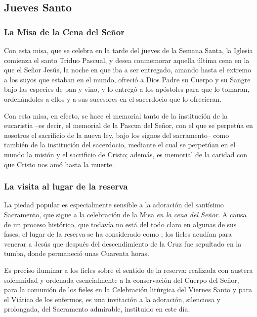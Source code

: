 \begin{introstyle}
\subsection{Jueves Santo} 

\subsubsection{La Misa de la Cena del Señor}

Con esta misa, que se celebra en la tarde del jueves de la Semana Santa, la Iglesia comienza el santo Triduo Pascual, y desea conmemorar aquella última cena en la que el Señor Jesús, la noche en que iba a ser entregado, amando hasta el extremo a los suyos que estaban en el mundo, ofreció a Dios Padre su Cuerpo y su Sangre bajo las especies de pan y vino, y lo entregó a los apóstoles para que lo tomaran, ordenándoles a ellos y a sus sucesores en el sacerdocio que lo ofrecieran.

Con esta misa, en efecto, se hace el memorial tanto de la institución de la eucaristía –es decir, el memorial de la Pascua del Señor, con el que se perpetúa en nosotros el sacrificio de la nueva ley, bajo los signos del sacramento– como también de la institución del sacerdocio, mediante el cual se perpetúan en el mundo la misión y el sacrificio de Cristo; además, es memorial de la caridad con que Cristo nos amó hasta la muerte. 

\subsubsection{La visita al lugar de la reserva}

La piedad popular es especialmente sensible a la adoración del santísimo Sacramento, que sigue a la celebración de la Misa \textit{en la cena del Señor}. A causa de un proceso histórico, que todavía no está del todo claro en algunas de sus fases, el lugar de la reserva se ha considerado como ; los fieles acudían para venerar a Jesús que después del descendimiento de la Cruz fue sepultado en la tumba, donde permaneció unas Cuarenta horas.

Es preciso iluminar a los fieles sobre el sentido de la reserva: realizada con austera solemnidad y ordenada esencialmente a la conservación del Cuerpo del Señor, para la comunión de los fieles en la Celebración litúrgica del Viernes Santo y para el Viático de los enfermos, es una invitación a la adoración, silenciosa y prolongada, del Sacramento admirable, instituido en este día.


\end{introstyle}
